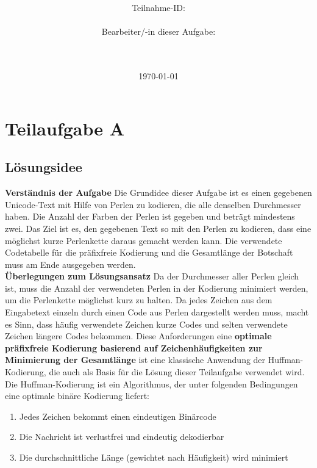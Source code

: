 \documentclass[a4paper,10pt,ngerman]{scrartcl}
\title{\textbf{\Huge\Aufgabe}}
\author{\LARGE Teilnahme-ID: \LARGE \TeilnahmeId \\\\
	    \LARGE Bearbeiter/-in dieser Aufgabe: \\ 
	    \LARGE \Name\\\\}
\date{\LARGE\today}
\begin{document}
\maketitle
\tableofcontents

\vspace{0.5cm}

\section{Teilaufgabe A}
\subsection{Lösungsidee}

\vspace{0.3cm}
\textbf{Verständnis der Aufgabe}
\newline
\newline
Die Grundidee dieser Aufgabe ist es einen gegebenen Unicode-Text mit Hilfe von Perlen zu kodieren, die alle denselben Durchmesser haben. Die Anzahl der Farben der Perlen ist gegeben und beträgt mindestens zwei. Das Ziel ist es, den gegebenen Text so mit den Perlen zu kodieren, dass eine möglichst kurze Perlenkette daraus gemacht werden kann. Die verwendete Codetabelle für die präfixfreie Kodierung und die Gesamtlänge der Botschaft muss am Ende ausgegeben werden.  \\
\newline
\textbf{Überlegungen zum Lösungsansatz}
\newline
\newline
Da der Durchmesser aller Perlen gleich ist, muss die Anzahl der verwendeten Perlen in der Kodierung minimiert werden, um die Perlenkette möglichst kurz zu halten. Da jedes Zeichen aus dem Eingabetext einzeln durch einen Code aus Perlen dargestellt werden muss, macht es Sinn, dass häufig verwendete Zeichen kurze Codes und selten verwendete Zeichen längere Codes bekommen. Diese Anforderungen eine
\textbf{optimale präfixfreie Kodierung basierend auf Zeichenhäufigkeiten zur Minimierung der Gesamtlänge}
ist eine klassische Anwendung der Huffman-Kodierung, die auch als Basis für die Lösung dieser Teilaufgabe verwendet wird. 
\newline
\newline
Die Huffman-Kodierung ist ein Algorithmus, der unter folgenden Bedingungen eine optimale binäre Kodierung liefert: 
\begin{enumerate}
  \item Jedes Zeichen bekommt einen eindeutigen Binärcode
  \item Die Nachricht ist verlustfrei und eindeutig dekodierbar
  \item Die durchschnittliche Länge (gewichtet nach Häufigkeit) wird minimiert
\end{enumerate}
\end{document}
